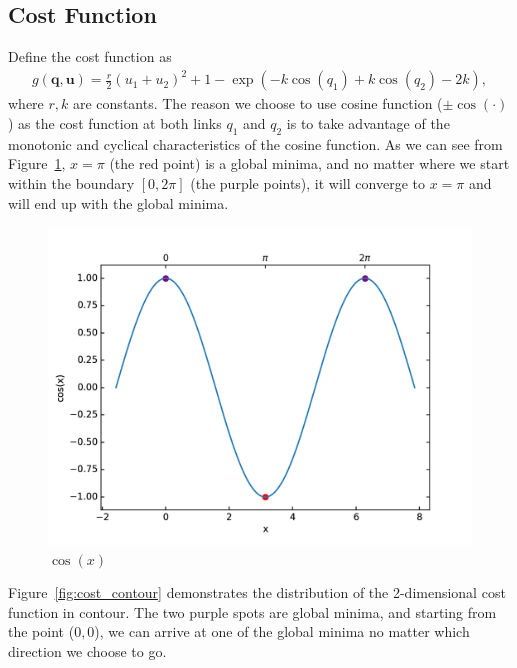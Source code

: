 \subsection{Cost Function}
\quad Define the cost function as
\begin{align}\label{eq:cost}
g(\mathbf q, \mathbf u) = \frac{r}{2}(u_1 + u_2)^2 + 1 - \exp(-k\cos(q_1) + k\cos(q_2) - 2k),
\end{align} where $r, k$ are constants. The reason we choose to use cosine function ($\pm \cos(\cdot)$) as the cost function at both links $q_1$ and $q_2$ is to take advantage of the monotonic and cyclical characteristics of the cosine function. As we can see from Figure~\ref{fig:cost}, $x = \pi$ (the red point) is a global minima, and no matter where we start within the boundary $[0, 2\pi]$ (the purple points), it will converge to $x = \pi$ and will end up with the global minima. \\
\begin{figure}[H]
\centering
\includegraphics[width=0.8\linewidth]{exp_cosx.png}
\caption{$\cos(x)$}
\label{fig:cost}
\end{figure}

Figure~\ref{fig:cost_contour} demonstrates the distribution of the 2-dimensional cost function in contour. The two purple spots are global minima, and starting from the point ($0, 0$), we can arrive at one of the global minima no matter which direction we choose to go.

